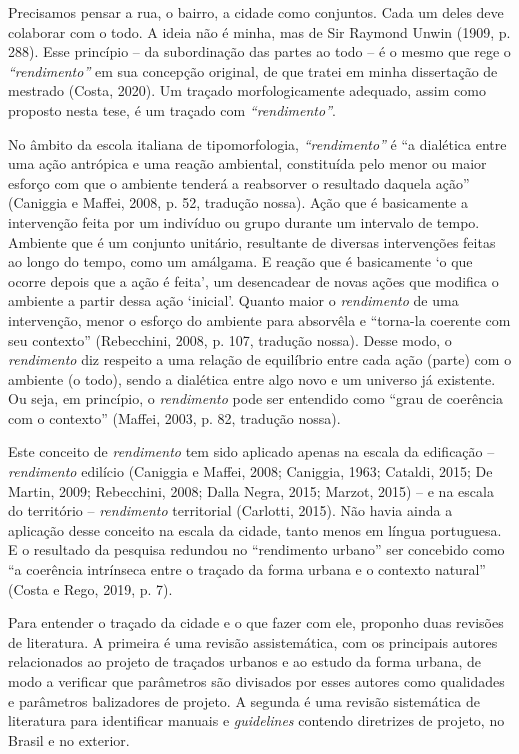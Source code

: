 \documentclass[12pt, a4paper]{book} %
\begin{document}
        Precisamos pensar a rua, o bairro, a cidade como conjuntos. Cada um deles deve colaborar com o todo. A ideia não é minha, mas de Sir Raymond Unwin (1909, p. 288). Esse princípio – da subordinação das partes ao todo – é o mesmo que rege o \textit{``rendimento''} em sua concepção original, de que tratei em minha dissertação de mestrado (Costa, 2020). Um traçado morfologicamente adequado, assim como proposto nesta tese, é um traçado com \textit{``rendimento''}.
        
        No âmbito da escola italiana de tipomorfologia, \textit{``rendimento''} é ``a dialética entre uma ação antrópica e uma reação ambiental, constituída pelo menor ou maior esforço com que o ambiente tenderá a reabsorver o resultado daquela ação'' (Caniggia e Maffei, 2008, p. 52, tradução nossa). Ação que é basicamente a intervenção feita por um indivíduo ou grupo durante um intervalo de tempo. Ambiente que é um conjunto unitário, resultante de diversas intervenções feitas ao longo do tempo, como um amálgama. E reação que é basicamente `o que ocorre depois que a ação é feita', um desencadear de novas ações que modifica o ambiente a partir dessa ação `inicial'. Quanto maior o \textit{rendimento} de uma intervenção, menor o esforço do ambiente para absorvêla e ``torna-la coerente com seu contexto'' (Rebecchini, 2008, p. 107, tradução nossa). Desse modo, o \textit{rendimento} diz respeito a uma relação de equilíbrio entre cada ação (parte) com o ambiente (o todo), sendo a dialética entre algo novo e um universo já existente. Ou seja, em princípio, o \textit{rendimento} pode ser entendido como ``grau de coerência com o contexto'' (Maffei, 2003, p. 82, tradução nossa).

        Este conceito de \textit{rendimento} tem sido aplicado apenas na escala da edificação – \textit{rendimento} edilício (Caniggia e Maffei, 2008; Caniggia, 1963; Cataldi, 2015; De Martin, 2009; Rebecchini, 2008; Dalla Negra, 2015; Marzot, 2015) – e na escala do território – \textit{rendimento} territorial (Carlotti, 2015). Não havia ainda a aplicação desse conceito na escala da cidade, tanto menos em língua portuguesa. E o resultado da pesquisa redundou no ``rendimento urbano'' ser concebido como ``a coerência intrínseca entre o traçado da forma urbana e o contexto natural'' (Costa e Rego, 2019, p. 7).

        Para entender o traçado da cidade e o que fazer com ele, proponho duas revisões de literatura. A primeira é uma revisão assistemática, com os principais autores relacionados ao projeto de traçados urbanos e ao estudo da forma urbana, de modo a verificar que parâmetros são divisados por esses autores como qualidades e parâmetros balizadores de projeto. A segunda é uma revisão sistemática de literatura para identificar manuais e \textit{guidelines} contendo diretrizes de projeto, no Brasil e no exterior.
\end{document}
